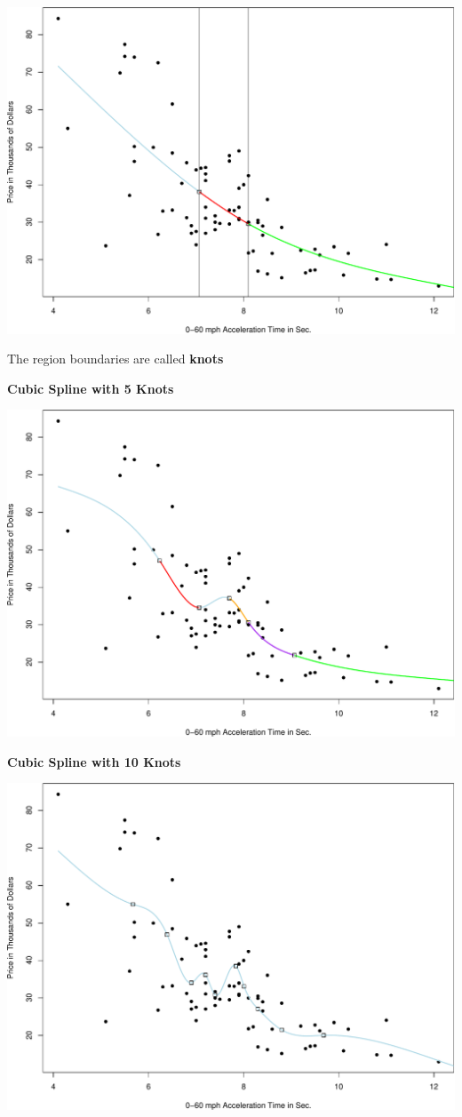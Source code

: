 \documentclass[
  letterpaper,
  DIV=11,
  numbers=noendperiod]{scrreprt}
\begin{document}
\includegraphics{Ch7_files/figure-pdf/unnamed-chunk-69-1.pdf}

The region boundaries are called \textbf{knots}

\textbf{Cubic Spline with 5 Knots}

\includegraphics{Ch7_files/figure-pdf/unnamed-chunk-70-1.pdf}

\textbf{Cubic Spline with 10 Knots}

\includegraphics{Ch7_files/figure-pdf/unnamed-chunk-71-1.pdf}
\end{document}
